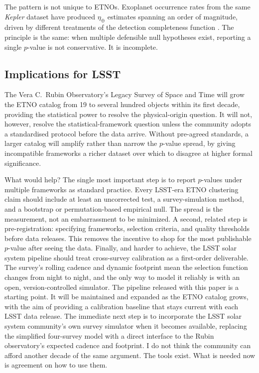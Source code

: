 \documentclass[usenatbib]{mnras}
\begin{document}
The pattern is not unique to ETNOs. Exoplanet occurrence rates from the same \textit{Kepler} dataset have produced $\eta_\oplus$ estimates spanning an order of magnitude, driven by different treatments of the detection completeness function \citep{bryson2021}. The principle is the same: when multiple defensible null hypotheses exist, reporting a single $p$-value is not conservative. It is incomplete.

\subsection{Implications for LSST}

The Vera C.\ Rubin Observatory's Legacy Survey of Space and Time will grow the ETNO catalog from 19 to several hundred objects within its first decade, providing the statistical power to resolve the physical-origin question. It will not, however, resolve the statistical-framework question unless the community adopts a standardised protocol before the data arrive. Without pre-agreed standards, a larger catalog will amplify rather than narrow the $p$-value spread, by giving incompatible frameworks a richer dataset over which to disagree at higher formal significance.

What would help? The single most important step is to report $p$-values under multiple frameworks as standard practice. Every LSST-era ETNO clustering claim should include at least an uncorrected test, a survey-simulation method, and a bootstrap or permutation-based empirical null. The spread is the measurement, not an embarrassment to be minimized. A second, related step is pre-registration: specifying frameworks, selection criteria, and quality thresholds before data releases. This removes the incentive to shop for the most publishable $p$-value after seeing the data. Finally, and harder to achieve, the LSST solar system pipeline should treat cross-survey calibration as a first-order deliverable. The survey's rolling cadence and dynamic footprint mean the selection function changes from night to night, and the only way to model it reliably is with an open, version-controlled simulator. The pipeline released with this paper is a starting point. It will be maintained and expanded as the ETNO catalog grows, with the aim of providing a calibration baseline that stays current with each LSST data release. The immediate next step is to incorporate the LSST solar system community's own survey simulator when it becomes available, replacing the simplified four-survey model with a direct interface to the Rubin observatory's expected cadence and footprint. I do not think the community can afford another decade of the same argument. The tools exist. What is needed now is agreement on how to use them.
\end{document}
